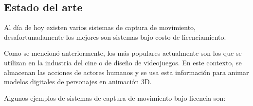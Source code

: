 \subsection{Estado del arte}

Al día de hoy existen varios sistemas de captura de movimiento, desafortunadamente los mejores son sistemas bajo costo de licenciamiento. 

Como se mencionó anteriormente, los más populares actualmente son los que se utilizan en la industria del cine o de diseño de videojuegos. En este contexto, se almacenan las acciones de actores humanos y se usa esta información para animar modelos digitales de personajes en animación 3D.

Algunos ejemplos de sistemas de captura de movimiento bajo licencia son:

